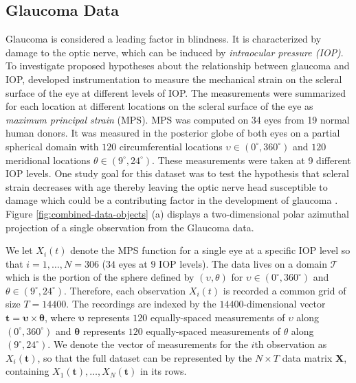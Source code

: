 \subsection{Glaucoma Data}

Glaucoma is considered a leading factor in blindness. It is characterized by damage to the optic nerve, which can be induced by \emph{intraocular pressure (IOP)}. 
To investigate proposed hypotheses about the relationship between glaucoma and IOP, \textcite{fazio_age-related_2014} developed instrumentation to measure the mechanical strain on the scleral surface of the eye at different levels of IOP. 
The measurements were summarized for each location at different locations on the scleral surface of the eye as \emph{maximum principal strain} (MPS). MPS was computed on 34 eyes from 19 normal human donors. It was measured in the posterior globe of both eyes on a partial spherical domain with $120$ circumferential locations $\upsilon \in (0^{\circ}, 360^{\circ})$ and $120$ meridional locations $\theta \in (9^{\circ}, 24^{\circ})$.
These measurements were taken at 9 different IOP levels.
One study goal for this dataset was to test the hypothesis that scleral strain decreases with age thereby leaving the optic nerve head susceptible to damage which could be a contributing factor in the development of glaucoma \parencite{lee_bayesian_2019}.
Figure \ref{fig:combined-data-objects} (a) displays a two-dimensional polar azimuthal projection of a single observation from the Glaucoma data.

We let $X_i(t)$ denote the MPS function for a single eye at a specific IOP level so that $i = 1, \dots, N = 306$ ($34$ eyes at $9$ IOP levels).
The data lives on a domain $\mathcal{T}$ which is the portion of the sphere defined by $(\upsilon, \theta)$ for $\upsilon \in (0^{\circ}, 360^{\circ})$ and $\theta \in (9^{\circ}, 24^{\circ})$.
Therefore, each observation $X_i(t)$ is recorded a common grid of size $T = 14400$.
The recordings are indexed by the $14400$-dimensional vector $\mathbf{t} = \boldsymbol{\upsilon} \times \boldsymbol{\theta}$, where $\boldsymbol{\upsilon}$ represents $120$ equally-spaced measurements of $\upsilon$ along $(0^{\circ}, 360^{\circ})$ and $\boldsymbol{\theta}$ represents $120$ equally-spaced measurements of $\theta$ along $(9^{\circ}, 24^{\circ})$.
We denote the vector of measurements for the $i$th observation as $X_i(\mathbf{t})$, so that the full dataset can be represented by the $N \times T$ data matrix $\mathbf{X}$, containing $X_1(\mathbf{t}), \dots, X_N(\mathbf{t})$ in its rows.

